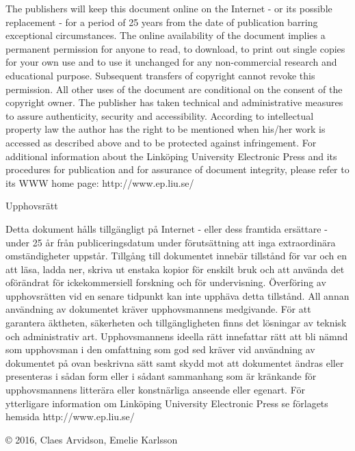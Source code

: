 \documentclass[a4paper, 10pt, twoside, openright]{book}
\newcommand{\putshortdate}[0]{2016}
\newcommand{\putauthor}[0]{Claes Arvidson, Emelie Karlsson}
\begin{document}
The publishers will keep this document online on the Internet - or its possible replacement - for a period of 25 years from the date of publication barring exceptional circumstances.
The online availability of the document implies a permanent permission for anyone to read, to download, to print out single copies for your own use and to use it unchanged for any non-commercial research and educational purpose. Subsequent transfers of copyright cannot revoke this permission. All other uses of the document are conditional on the consent of the copyright owner. The publisher has taken technical and administrative measures to assure authenticity, security and accessibility.
According to intellectual property law the author has the right to be mentioned when his/her work is accessed as described above and to be protected against infringement.
For additional information about the Linköping University Electronic Press and its procedures for publication and for assurance of document integrity, please refer to its WWW home page: http://www.ep.liu.se/
\bigskip

Upphovsr\"att
\medskip

Detta dokument hålls tillgängligt på Internet - eller dess framtida ersättare - under 25 år från publiceringsdatum under förutsättning att inga extraordi\-nära omständigheter uppstår.
Tillgång till dokumentet innebär tillstånd för var och en att läsa, ladda ner, skriva ut enstaka kopior för enskilt bruk och att använda det oförändrat för ickekommersiell forskning och för undervisning. Överföring av upphovsrätten vid en senare tidpunkt kan inte upphäva detta tillstånd. All annan användning av dokumentet kräver upphovsmannens medgivande. För att garantera äktheten, säkerheten och tillgängligheten finns det lösningar av teknisk och administrativ art.
Upphovsmannens ideella rätt innefattar rätt att bli nämnd som upphovsman i den omfattning som god sed kräver vid användning av dokumentet på ovan beskrivna sätt samt skydd mot att dokumentet ändras eller presenteras i sådan form eller i sådant sammanhang som är kränkande för upphovsmannens litterära eller konstnärliga anseende eller egenart.
För ytterligare information om Linköping University Electronic Press se förlagets hemsida http://www.ep.liu.se/

\medskip

\copyright\phantom{.} \putshortdate, \putauthor




\end{document}
